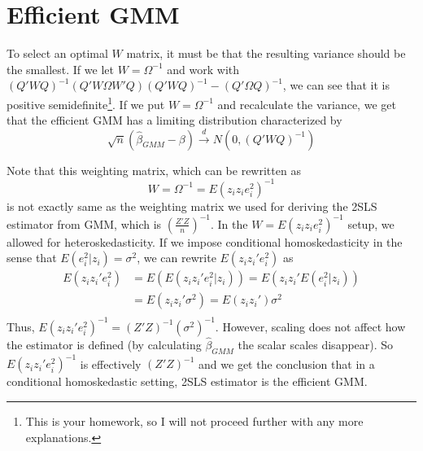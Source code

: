 \section{Efficient GMM}
To select an optimal $W$ matrix, it must be that the resulting variance should be the smallest. If we let $W=\Omega^{-1}$ and work with $(Q'WQ)^{-1}(Q'W\Omega W'Q)(Q'WQ)^{-1}-(Q'\Omega Q)^{-1}$, we can see that it is positive semidefinite\footnote{This is your homework, so I will not proceed further with any more explanations.}.
If we put $W=\Omega^{-1}$ and  recalculate the variance, we get that the efficient GMM has a limiting distribution characterized by
\[
\sqrt{n}(\hat{\beta}_{GMM}-\beta)\xrightarrow{d}N(0,(Q'WQ)^{-1})
\]\par
Note that this weighting matrix, which can be rewritten as
\[
W=\Omega^{-1}=E(z_iz_ie_i^2)^{-1}
\]
is not exactly same as the weighting matrix we used for deriving the 2SLS estimator from GMM, which is $\left(\frac{Z'Z}{n}\right)^{-1}$. In the $W=E(z_iz_ie_i^2)^{-1}$ setup, we allowed for heteroskedasticity. If we impose conditional homoskedasticity in the sense that $E(e_i^2|z_i)=\sigma^2$, we can rewrite $E(z_iz_i'e_i^2)$ as
\[
\begin{aligned}
E(z_iz_i'e_i^2)&=E(E(z_iz_i'e_i^2|z_i))=E(z_iz_i'E(e_i^2|z_i))\\
&=E(z_iz_i'\sigma^2)=E(z_iz_i')\sigma^2\\
\end{aligned}
\]
Thus, $E(z_iz_i'e_i^2)^{-1}=(Z'Z)^{-1}(\sigma^2)^{-1}$. However, scaling does not affect how the estimator is defined (by calculating $\hat{\beta}_{GMM}$ the scalar scales disappear). So $E(z_iz_i'e_i^2)^{-1}$ is effectively $(Z'Z)^{-1}$ and we get the conclusion that in a conditional homoskedastic setting, 2SLS estimator is the efficient GMM. 
